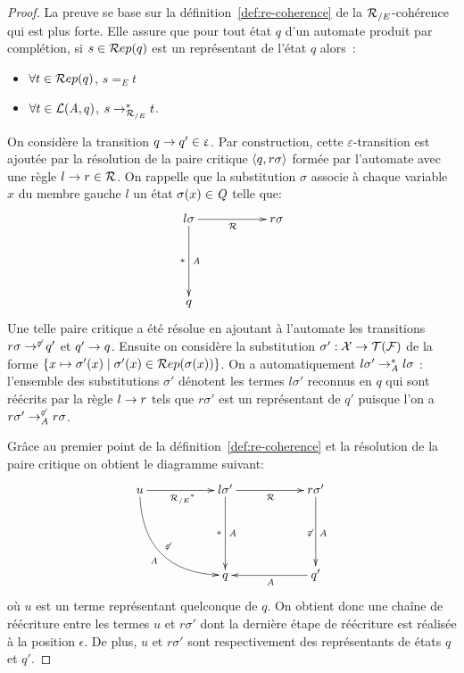\begin{proof}
  La preuve se base sur la définition~\ref{def:re-coherence} de la ${\mathcal R_{/E}}$-cohérence qui est plus forte.
  Elle assure que pour tout état $q$ d'un automate produit par complétion, si $s \in \mathcal R ep (q)$ est un représentant de l'état $q$
  alors~:
  \begin{itemize}
  \item $\forall t \in \mathcal R ep(q)$, $s =_E t$
  \item $\forall t \in \mathcal{L}(\mathit A, q)$, $s \rightarrow_{\mathcal R_{/E}}^* t$.
  \end{itemize}

  On considère la transition $q \rightarrow q' \in \upvarepsilon$. Par construction, cette $\varepsilon$-transition est ajoutée
  par la résolution de la paire critique $\langle q, r\sigma\rangle$ formée par l'automate avec une règle $l\rightarrow r \in \mathcal R$.
  On rappelle que la substitution $\sigma$ associe à chaque variable $x$ du membre gauche $l$ un état $\sigma(x) \in \mathit Q$
  telle que:
  \[
  \xymatrix{
    l\sigma \ar[dd]^{\A}_{*} \ar[rr]_{\R}  & & r\sigma\\ %
    & & \\
    q & &%
  }
  \]
  Une telle paire critique a été résolue en ajoutant à l'automate les transitions $r\sigma \rightarrow^{\not\varepsilon} q'$ et $q' \rightarrow q$.
  Ensuite on considère la substitution $\sigma' : \mathcal X \rightarrow \mathcal{T(F)}$ de la forme
  $\{ x \mapsto \sigma'(x) \; | \; \sigma'(x) \in \mathcal R ep(\sigma(x)) \}$. On a automatiquement $l\sigma' \rightarrow_{\mathit A}^* l\sigma$ :
  l'ensemble des substitutions $\sigma'$ dénotent les termes $l\sigma'$ reconnus en $q$ qui sont réécrits par la règle $l \rightarrow r$ 
  tels que  $r\sigma'$ est un représentant de $q'$ puisque l'on a $r\sigma' \rightarrow^{\not\varepsilon}_{\mathit A} r\sigma$.

  Grâce au premier point de la définition~\ref{def:re-coherence} et la résolution de la paire critique
  on obtient le diagramme suivant:
  \[
  \xymatrix{
    u \ar[rr]_{\RE^*} \ar@/_2pc/[rrdd]^{\not\varepsilon}_{\A} & & l\sigma' \ar[dd]^{\A}_{*} \ar[rr]_{\R}  & & r\sigma' \ar[dd]^{\A}_{\not\varepsilon}\\
    & & & & \\
    & & q & & q' \ar[ll]^{\A}
  }
  \]
  où $u$ est un terme représentant quelconque de $q$. On obtient donc une chaîne de réécriture entre les termes $u$ et $r\sigma'$
  dont la dernière étape de réécriture est réalisée à la position $\epsilon$. De plus, 
  $u$ et $r\sigma'$ sont respectivement des représentants de états $q$ et $q'$.


\end{proof}
